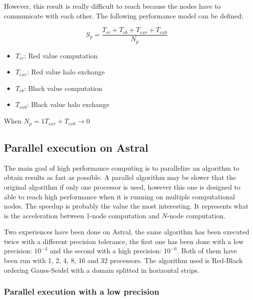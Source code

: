\documentclass[a4paper,11pt]{article}
\begin{document}
However, this result is really difficult to reach because the nodes have to communicate with each other.
The following performance model can be defined:

\[
S_p = \frac{T_{cr} + T_{cb} + T_{exr} + T_{exb}}{N_p}
\]

\begin{itemize}
  \item{$T_{cr}$: Red value computation}
  \item{$T_{exr}$: Red value halo exchange}
  \item{$T_{cb}$: Black value computation}
  \item{$T_{exb}$: Black value halo exchange}
\end{itemize}

When $N_p = 1$\hspace{2em}$T_{exr} + T_{exb} \rightarrow 0$

\subsection{Parallel execution on Astral}

The main goal of high performance computing is to parallelize an algorithm to obtain results as fast
as possible. A parallel algorithm may be slower that the original algorithm if only one processor is
used, however this one is designed to able to reach high performance when it is running on multiple
computational nodes. The speedup is probably the value the most interesting. It represents what is
the acceleration between 1-node computation and $N$-node computation. 

Two experiences have been done on Astral, the same algorithm has been executed twice with a different
precision tolerance, the first one has been done with a low precision: $10^{-4}$ and the second with
a high precision: $10^{-6}$. Both of them have been run with 1, 2, 4, 8, 16 and 32 processors. The
algorithm used is Red-Black ordering Gauss-Seidel with a domain splitted in horizontal strips.

\subsubsection{Parallel execution with a low precision}
\end{document}
